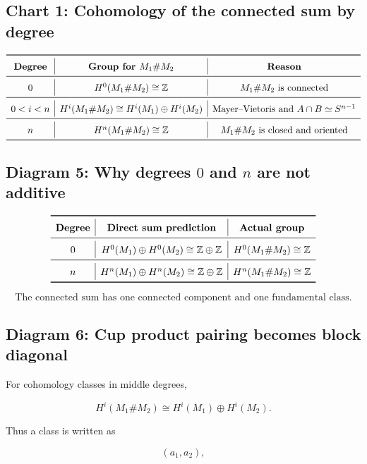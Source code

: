 \documentclass[12pt,a4paper]{article}
\theoremstyle{notespace}
\begin{document}
\subsection{Chart 1: Cohomology of the connected sum by degree}

\[
\renewcommand{\arraystretch}{1.45}
\begin{array}{c|c|c}
	\toprule
	\textbf{Degree} & \textbf{Group for }M_1\#M_2 & \textbf{Reason} \\
	\midrule
	0
	&
	H^0(M_1\#M_2)\cong \mathbb Z
	&
	M_1\#M_2\text{ is connected}
	\\
	\midrule
	0<i<n
	&
	H^i(M_1\#M_2)\cong H^i(M_1)\oplus H^i(M_2)
	&
	\text{Mayer--Vietoris and }A\cap B\simeq S^{n-1}
	\\
	\midrule
	n
	&
	H^n(M_1\#M_2)\cong \mathbb Z
	&
	M_1\#M_2\text{ is closed and oriented}
	\\
	\bottomrule
\end{array}
\]

\subsection{Diagram 5: Why degrees \(0\) and \(n\) are not additive}

\[
\renewcommand{\arraystretch}{1.45}
\begin{array}{c|c|c}
	\toprule
	\textbf{Degree} & \textbf{Direct sum prediction} & \textbf{Actual group} \\
	\midrule
	0
	&
	H^0(M_1)\oplus H^0(M_2)\cong \mathbb Z\oplus \mathbb Z
	&
	H^0(M_1\#M_2)\cong \mathbb Z
	\\
	\midrule
	n
	&
	H^n(M_1)\oplus H^n(M_2)\cong \mathbb Z\oplus \mathbb Z
	&
	H^n(M_1\#M_2)\cong \mathbb Z
	\\
	\bottomrule
\end{array}
\]

\[
\boxed{
	\text{The connected sum has one connected component and one fundamental class.}
}
\]

\subsection{Diagram 6: Cup product pairing becomes block diagonal}

For cohomology classes in middle degrees,

\[
H^i(M_1\#M_2)
\cong
H^i(M_1)\oplus H^i(M_2).
\]

Thus a class is written as

\[
(a_1,a_2),
\]
\end{document}
